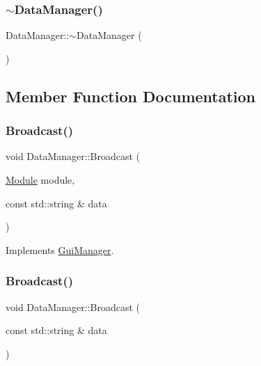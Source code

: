 \subsubsection{\texorpdfstring{$\sim$DataManager()}{~DataManager()}}
{\footnotesize\ttfamily Data\+Manager\+::$\sim$\+Data\+Manager (\begin{DoxyParamCaption}{ }\end{DoxyParamCaption})}



\subsection{Member Function Documentation}
\mbox{\label{class_data_manager_a645613a4c6cca77e73aff3c9a05fd696}} 
\subsubsection{\texorpdfstring{Broadcast()}{Broadcast()}\hspace{0.1cm}{\footnotesize\ttfamily [1/2]}}
{\footnotesize\ttfamily void Data\+Manager\+::\+Broadcast (\begin{DoxyParamCaption}\item[{\mbox{\hyperlink{_mediator_2_mediator_2_commons_8h_a88683b64d84542943724ba0f211153af}{Module}}}]{module,  }\item[{const std\+::string \&}]{data }\end{DoxyParamCaption})\hspace{0.3cm}{\ttfamily [virtual]}}



Implements \mbox{\hyperlink{class_gui_manager_a32754b1f01775df580985ee9e6318a2f}{Gui\+Manager}}.

\mbox{\label{class_data_manager_a46cc380fc22a3069d3e55800b3f39d4f}} 
\subsubsection{\texorpdfstring{Broadcast()}{Broadcast()}\hspace{0.1cm}{\footnotesize\ttfamily [2/2]}}
{\footnotesize\ttfamily void Data\+Manager\+::\+Broadcast (\begin{DoxyParamCaption}\item[{const std\+::string \&}]{data }\end{DoxyParamCaption})\hspace{0.3cm}{\ttfamily [virtual]}}



